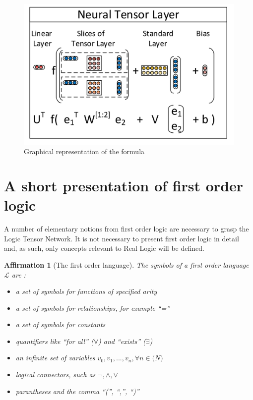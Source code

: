 \documentclass{article}
\newtheorem{prop}{Affirmation}[section]
\begin{document}
\begin{figure}[H]
	\includegraphics[scale=0.15]{ntn_rep}
	\caption{Graphical representation of the formula \cite{NTN}}
\end{figure}

\section{A short presentation of first order logic}
A number of elementary notions from first order logic are necessary to grasp the Logic Tensor Network. It is not necessary to present first order logic in detail and, as such, only concepts relevant to Real Logic will be defined.

\begin{prop}[The first order language]
The symbols of a first order language $\mathcal{L}$ are \cite{FOL}:\\
\begin{itemize} 
	\item a set of symbols for functions of specified arity
	\item a set of symbols for relationships, for example ``=''
	\item a set  of symbols for constants
	\item quantifiers like ``for all'' ($\forall$) and ``exists'' ($\exists$)
	\item an infinite set of variables $v_0, v_1, ..., v_n, \forall n \in \mathbf(N)$
	\item logical connectors, such as $\neg, \land, \lor$
	\item parantheses and the comma ``('', ``,'', ``)''
\end{itemize}
\end{prop}
\end{document}
